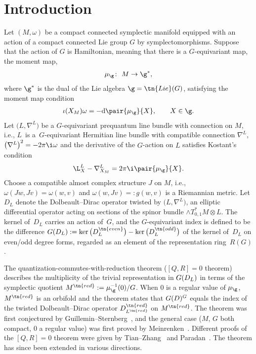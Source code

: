 \section{Introduction}
Let $(M,\omega)$ be a compact connected symplectic manifold equipped with an action of a compact connected Lie group $G$ by symplectomorphisms. Suppose that the action of $G$ is Hamiltonian, meaning that there is a $G$-equivariant map, the moment map,
\[ \mu_\g \colon \ M \rightarrow \g^\ast,\]
where $\g^\ast$ is the dual of the Lie algebra $\g=\tn{Lie}(G)$, satisfying the moment map condition
\begin{gather}\label{eqn:mm}
\iota(X_M)\omega=-{\rm d}\pair{\mu_\g}{X}, \qquad X \in \g.
\end{gather}
Let $\big(L,\nabla^L\big)$ be a $G$-equivariant prequantum line bundle with connection on $M$, i.e., $L$~is a~$G$-equivariant Hermitian line bundle with compatible connection $\nabla^L$, $\big(\nabla^L\big)^2=-2\pi \i \omega$ and the derivative of the $G$-action on $L$ satisfies Kostant's condition
\[ \L^L_X-\nabla^L_{X_M}=2\pi \i\pair{\mu_\g}{X}.\]
Choose a compatible almost complex structure $J$ on $M$, i.e., $\omega(Jw,Jv)=\omega(w,v)$ and $\omega(w,Jv)\allowbreak =:g(w,v)$ is a Riemannian metric. Let $D_L$ denote the Dolbeault--Dirac operator twisted by $\big(L,\nabla^L\big)$, an elliptic differential operator acting on sections of the spinor bundle $\wedge T^\ast_{0,1}M\otimes L$. The kernel of~$D_L$ carries an action of~$G$, and the $G$-equivariant index is defined to be the difference $\index_G(D_L):=\ker\big(D_L^{\tn{even}}\big)-\ker\big(D_L^{\tn{odd}}\big)$ of the kernel of~$D_L$ on even/odd degree forms, regarded as an element of the representation ring~$R(G)$.

The quantization-commutes-with-reduction theorem ($[Q,R]=0$ theorem) describes the multiplicity of the trivial representation in $\index_G(D_L)$ in terms of the symplectic quotient $M^{\tn{red}}:=\mu_\g^{-1}(0)/G$. When $0$ is a regular value of $\mu_\g$, $M^{\tn{red}}$ is an orbifold and the theorem states that $\index_G(D)^G$ equals the index of the twisted Dolbeault--Dirac operator $D^{\tn{red}}_{L^{\tn{red}}}$ on $M^{\tn{red}}$. The theorem was first conjectured by Guillemin--Sternberg~\cite{GuilleminSternbergConjecture}, and the general case ($M$, $G$ both compact, $0$ a regular value) was first proved by Meinrenken~\cite{MeinrenkenSymplecticSurgery}. Different proofs of the $[Q,R]=0$ theorem were given by Tian--Zhang~\cite{TianZhang} and Paradan~\cite{ParadanRiemannRoch}. The theorem has since been extended in various directions.

